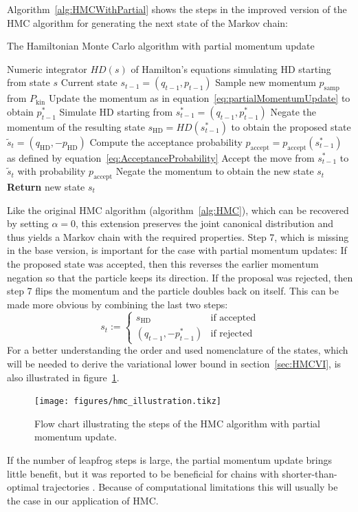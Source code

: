 Algorithm~\ref{alg:HMCWithPartial} shows the steps in the improved version of the HMC algorithm for generating the next state of the Markov chain:
\begin{algorithm}
\caption{The Hamiltonian Monte Carlo algorithm with partial momentum update}\label{alg:HMCWithPartial}
\begin{algorithmic}[1]
\Require Numeric integrator $HD(s)$ of Hamilton's equations simulating HD starting from state $s$
\Require Current state $s_{t-1} = (q_{t-1}, p_{t-1})$
\State Sample new momentum $p_\textrm{samp}$ from $P_\textrm{kin}$
\State Update the momentum as in equation~\eqref{eq:partialMomentumUpdate} to obtain $p^*_{t-1}$
\State Simulate HD starting from $s^*_{t-1} = (q_{t-1}, p^*_{t-1})$
\State Negate the momentum of the resulting state $s_\textrm{HD} = HD(s^*_{t-1})$ to obtain the proposed state $\tilde{s}_t = (q_\textrm{HD}, - p_\textrm{HD})$
\State Compute the acceptance probability $p_\textrm{accept}=p_\textrm{accept}(s^*_{t-1})$ as defined by equation~\eqref{eq:AcceptanceProbability}
\State Accept the move from $s^*_{t-1}$ to $\tilde{s}_t$ with probability $p_\textrm{accept}$
\State Negate the momentum to obtain the new state $s_t$
\State \textbf{Return} new state $s_t$
\end{algorithmic}
\end{algorithm}
Like the original HMC algorithm (algorithm~\ref{alg:HMC}), which can be recovered by setting $\alpha = 0$, this extension preserves the joint canonical distribution and thus yields a Markov chain with the required properties. Step 7, which is missing in the base version, is important for the case with partial momentum updates: If the proposed state was accepted, then this reverses the earlier momentum negation so that the particle keeps its direction. If the proposal was rejected, then step 7 flips the momentum and the particle doubles back on itself. This can be made more obvious by combining the last two steps:
\begin{equation} \label{eq:StateAfterAcceptReject}
s_t := \begin{cases} s_\textrm{HD} & \textrm{if accepted} \\ 
								(q_{t-1}, -p^*_{t-1}) & \textrm{if rejected}
					  \end{cases}
\end{equation}
For a better understanding the order and used nomenclature of the states, which will be needed to derive the variational lower bound in section~\ref{sec:HMCVI}, is also illustrated in figure~\ref{fig:HMC_schematic}.

\begin{figure}
\centering
\texttt{[image: figures/hmc\_illustration.tikz]}
\caption{Flow chart illustrating the steps of the HMC algorithm with partial momentum update.}
\label{fig:HMC_schematic}
\end{figure}

If the number of leapfrog steps is large, the partial momentum update brings little benefit, but it was reported to be beneficial for chains with shorter-than-optimal trajectories \parencite{Neal2011}. Because of computational limitations this will usually be the case in our application of HMC.
